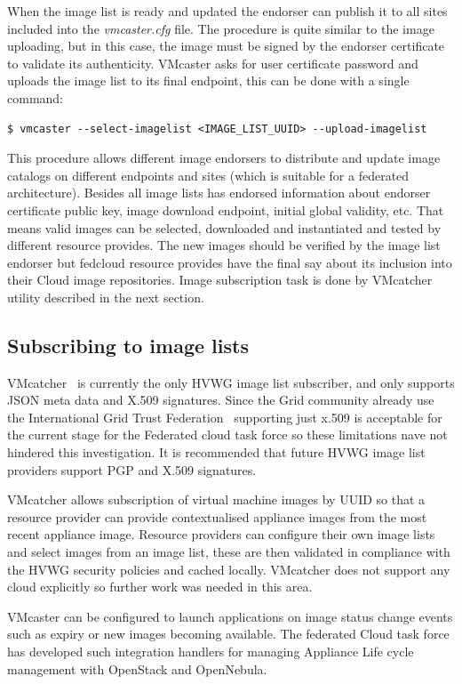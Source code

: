 \documentclass{cai}
\begin{document}
When the image list is ready and updated the endorser can publish it to all sites included into the \textit{vmcaster.cfg} file. 
The procedure is quite similar to the image uploading, but in this case, the image must be signed by the endorser certificate to validate its authenticity.
VMcaster asks for user certificate password and uploads the image list to its final endpoint, this can be done with a single command:
\begin{verbatim}
$ vmcaster --select-imagelist <IMAGE_LIST_UUID> --upload-imagelist
\end{verbatim}
This procedure allows different image endorsers to distribute and update image catalogs on different endpoints and sites (which is suitable for a federated architecture).
Besides all image lists has endorsed information about endorser certificate public key, image download endpoint, initial global validity, etc. 
That means valid images can be selected, downloaded and instantiated and tested by different resource provides. 
The new images should be verified by the image list endorser but fedcloud resource provides have the final say about its inclusion into their Cloud image repositories. 
Image subscription task is done by VMcatcher utility described in the next section.


\subsection{Subscribing to image lists}
VMcatcher~\cite{vmcatcher} is currently the only HVWG image list subscriber, and only supports JSON meta data and X.509 signatures. Since the Grid community already use the International Grid Trust Federation~\cite{igtf} supporting just x.509 is acceptable for the current stage for the Federated cloud task force so these limitations nave not hindered this investigation. 
It is recommended that future HVWG image list providers support PGP and X.509 signatures.

VMcatcher allows subscription of virtual machine images by UUID so that a resource provider can provide contextualised appliance images from the most recent appliance image. Resource providers can configure their own image lists and select images from an image list, these are then validated in compliance with the HVWG security policies and cached locally. 
VMcatcher does not support any cloud explicitly so further work was needed in this area.

VMcaster can be configured to launch applications on image status change events such as expiry or new images becoming available. The federated Cloud task force has developed such integration handlers for managing Appliance Life cycle management with OpenStack and OpenNebula.
\end{document}
